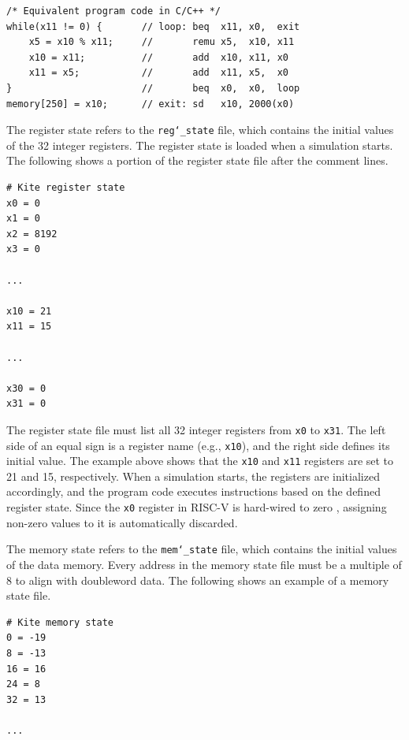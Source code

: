 \documentclass[10pt]{article}
\begin{document}
\begin{Verbatim}[frame=single,fontsize=\small]
/* Equivalent program code in C/C++ */
while(x11 != 0) {       // loop: beq  x11, x0,  exit
    x5 = x10 % x11;     //       remu x5,  x10, x11
    x10 = x11;          //       add  x10, x11, x0
    x11 = x5;           //       add  x11, x5,  x0
}                       //       beq  x0,  x0,  loop
memory[250] = x10;      // exit: sd   x10, 2000(x0)
\end{Verbatim}

The register state refers to the {\tt\small reg\char`_state} file, which contains the initial values of the 32 integer registers.
The register state is loaded when a simulation starts.
The following shows a portion of the register state file after the comment lines.

\begin{Verbatim}[frame=single,fontsize=\small]
# Kite register state
x0 = 0
x1 = 0
x2 = 8192
x3 = 0

...

x10 = 21
x11 = 15

...

x30 = 0
x31 = 0
\end{Verbatim}

The register state file must list all 32 integer registers from {\tt\small x0} to {\tt\small x31}.
The left side of an equal sign is a register name (e.g., {\tt\small x10}), and the right side defines its initial value.
The example above shows that the {\tt\small x10} and {\tt\small x11} registers are set to 21 and 15, respectively.
When a simulation starts, the registers are initialized accordingly, and the program code executes instructions based on the defined register state.
Since the {\tt\small x0} register in RISC-V is hard-wired to zero \cite{patterson_morgan2017}, assigning non-zero values to it is automatically discarded.

The memory state refers to the {\tt\small mem\char`_state} file, which contains the initial values of the data memory.
Every address in the memory state file must be a multiple of 8 to align with doubleword data.
The following shows an example of a memory state file.

\begin{Verbatim}[frame=single,fontsize=\small]
# Kite memory state
0 = -19
8 = -13
16 = 16
24 = 8
32 = 13

...

\end{Verbatim}
\end{document}
